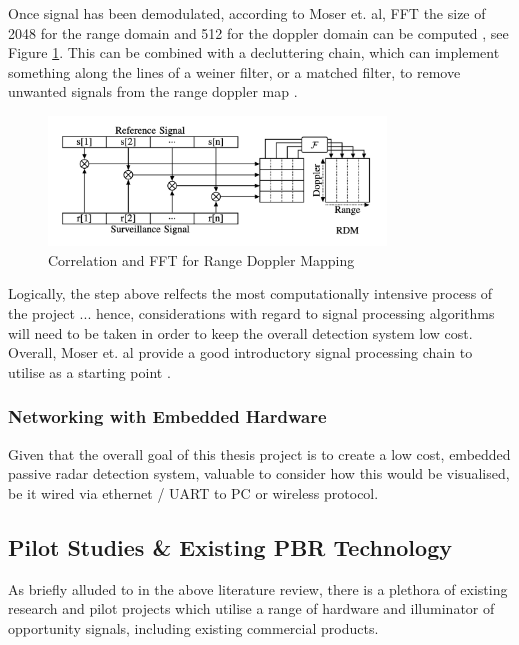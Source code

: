\documentclass[12pt,a4paper]{article}
\begin{document}
\par \vspace{0.5cm} 
\noindent Once signal has been demodulated, according to Moser et. al, FFT the size of 2048 for the range domain and 512 for the doppler domain can be computed \cite{IOTpassiveRadar}, see Figure \ref{fig:FFT}. This can be combined with a decluttering chain, which can implement something along the lines of a weiner filter, or a matched filter, to remove unwanted signals from the range doppler map \cite{FundamentalsPassiveRadar}.

\begin{figure}[htbp]
    \centering
    \includegraphics[width=0.8\textwidth]{FFT.png}
    \caption{Correlation and FFT for Range Doppler Mapping \cite{IOTpassiveRadar}}
    \label{fig:FFT}
\end{figure}
\par \vspace{0.5cm} 
\noindent Logically, the step above relfects the most computationally intensive process of the project ... hence, considerations with regard to signal processing algorithms will need to be taken in order to keep the overall detection system low cost. Overall, Moser et. al provide a good introductory signal processing chain to utilise as a starting point \cite{IOTpassiveRadar}.

\subsubsection{Networking with Embedded Hardware} 
Given that the overall goal of this thesis project is to create a low cost, embedded passive radar detection system, valuable to consider how this would be visualised, be it wired via ethernet / UART to PC or wireless protocol. 

\subsection{Pilot Studies \& Existing PBR Technology}
As briefly alluded to in the above literature review, there is a plethora of existing research and pilot projects which utilise a range of hardware and illuminator of opportunity signals, including existing commercial products.
\end{document}
